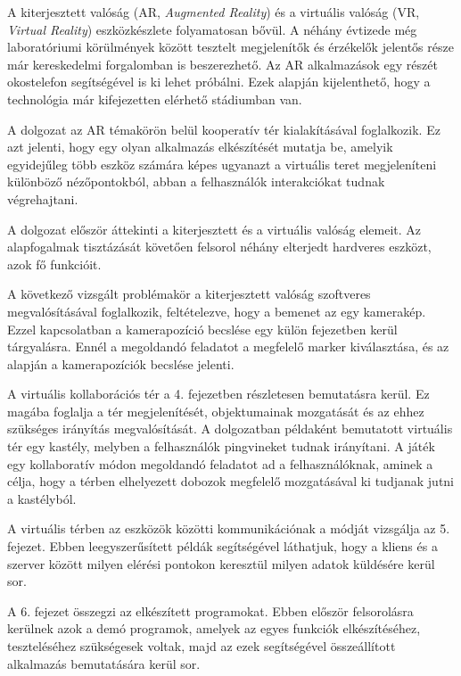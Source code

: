 
A kiterjesztett valóság (AR, \textit{Augmented Reality}) és a virtuális valóság (VR, \textit{Virtual Reality}) eszközkészlete folyamatosan bővül.
A néhány évtizede még laboratóriumi körülmények között tesztelt megjelenítők és érzékelők jelentős része már kereskedelmi forgalomban is beszerezhető.
Az AR alkalmazások egy részét okostelefon segítségével is ki lehet próbálni.
Ezek alapján kijelenthető, hogy a technológia már kifejezetten elérhető stádiumban van.

A dolgozat az AR témakörön belül kooperatív tér kialakításával foglalkozik.
Ez azt jelenti, hogy egy olyan alkalmazás elkészítését mutatja be, amelyik egyidejűleg több eszköz számára képes ugyanazt a virtuális teret megjeleníteni különböző nézőpontokból, abban a felhasználók interakciókat tudnak végrehajtani.

A dolgozat először áttekinti a kiterjesztett és a virtuális valóság elemeit.
Az alapfogalmak tisztázását követően felsorol néhány elterjedt hardveres eszközt, azok fő funkcióit.

A következő vizsgált problémakör a kiterjesztett valóság szoftveres megvalósításával foglalkozik, feltételezve, hogy a bemenet az egy kamerakép.
Ezzel kapcsolatban a kamerapozíció becslése egy külön fejezetben kerül tárgyalásra.
Ennél a megoldandó feladatot a megfelelő marker kiválasztása, és az alapján a kamerapozíciók becslése jelenti.

A virtuális kollaborációs tér a 4. fejezetben részletesen bemutatásra kerül. Ez magába foglalja a tér megjelenítését, objektumainak mozgatását és az ehhez szükséges irányítás megvalósítását.
A dolgozatban példaként bemutatott virtuális tér egy kastély, melyben a felhasználók pingvineket tudnak irányítani.
A játék egy kollaboratív módon megoldandó feladatot ad a felhasználóknak, aminek a célja, hogy a térben elhelyezett dobozok megfelelő mozgatásával ki tudjanak jutni a kastélyból.

A virtuális térben az eszközök közötti kommunikációnak a módját vizsgálja az 5. fejezet. Ebben leegyszerűsített példák segítségével láthatjuk, hogy a kliens és a szerver között milyen elérési pontokon keresztül milyen adatok küldésére kerül sor.

A 6. fejezet összegzi az elkészített programokat. Ebben először felsorolásra kerülnek azok a demó programok, amelyek az egyes funkciók elkészítéséhez, teszteléséhez szükségesek voltak, majd az ezek segítségével összeállított alkalmazás bemutatására kerül sor.
